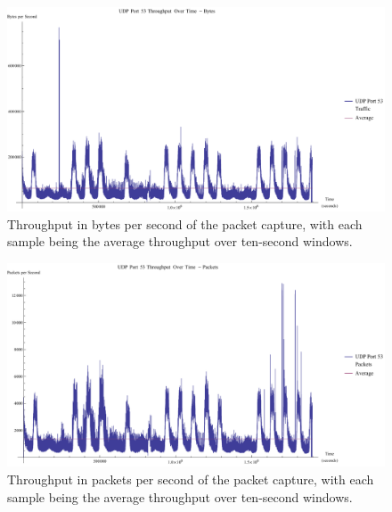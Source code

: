 \documentclass[12pt]{report}
\theoremstyle{remark}
\theoremstyle{definition}
\theoremstyle{definition}
\theoremstyle{definition}
\begin{document}
\begin{appendices}
\begin{figure}
\centering
\includegraphics[width=\textwidth]{figures/pcap-tpb.pdf}
\caption[Throughput in Bytes per Second of Packet Capture]{Throughput in bytes per second of the packet capture, with each sample being the average throughput over ten-second windows.}
\label{pcap-tpb}
\end{figure}

\begin{figure}
\centering
\includegraphics[width=\textwidth]{figures/pcap-tpp.pdf}
\caption[Throughput in Packets per Second of Packet Capture]{Throughput in packets per second of the packet capture, with each sample being the average throughput over ten-second windows.}
\label{pcap-tpp}
\end{figure}





\end{appendices}
\end{document}
